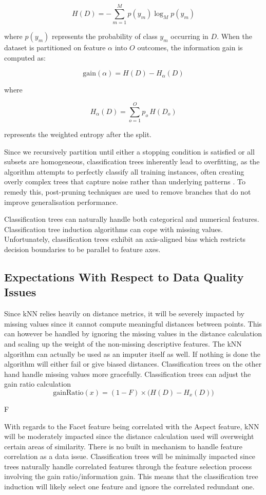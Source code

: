 \documentclass[conference]{IEEEtran}
\begin{document}
\[
H(D) = -\sum_{m=1}^{M} p(y_m) \log_{M} p(y_m)
\]

where $p(y_m)$ represents the probability of class $y_m$ occurring in $D$. When the dataset is partitioned on feature $\alpha$ into $O$ outcomes, the information gain is computed as:

\[
\text{gain}(\alpha) = H(D) - H_\alpha(D)
\]

where 

\[
H_\alpha(D) = \sum_{o=1}^{O} p_o \, H(D_o)
\]

represents the weighted entropy after the split.

Since we recursively partition until either a stopping condition is satisfied or all subsets are homogeneous, classification trees inherently lead to overfitting, as the algorithm attempts to perfectly classify all training instances, often creating overly complex trees that capture noise rather than underlying patterns \cite{quinlan1993c45}. To remedy this, post-pruning techniques are used to remove branches that do not improve generalisation performance.

Classification trees can naturally handle both categorical and numerical features. Classification tree induction algorithms can cope with missing values. Unfortunately, classification trees exhibit an axis-aligned bias which restricts decision boundaries to be parallel to feature axes.

\subsection{Expectations With Respect to Data Quality Issues}
Since kNN relies heavily on distance metrics, it will be severely impacted by missing values since it cannot compute meaningful distances between points. This can however be handled by ignoring the missing values in the distance calculation and scaling up the weight of the non-missing descriptive features. The kNN algorithm can actually be used as an imputer itself as well. If nothing is done the algorithm will either fail or give biased distances. Classification trees on the other hand handle missing values more gracefully. Classification trees can adjust the gain ratio calculation 
\[
\text{gainRatio}(x) = (1 - F) \times \big( H(D) - H_x(D) \big)
\]

 F 



With regards to the Facet feature being correlated with the Aspect feature, kNN will be moderately impacted since the distance calculation used will overweight certain areas of similarity. There is no built in mechanism to handle feature correlation as a data issue. Classification trees will be minimally impacted since trees naturally handle correlated features through the feature selection process involving the gain ratio/information gain. This means that the classification tree induction will likely select one feature and ignore the correlated redundant one.
\end{document}
